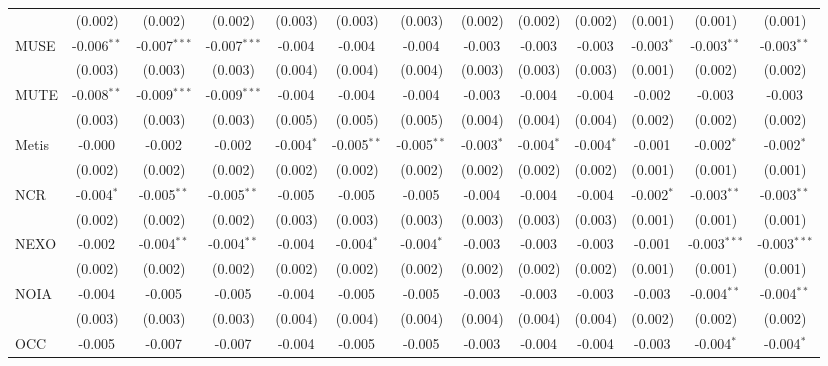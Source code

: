 \begin{table}[!htbp]
\begin{tabular}{@{\extracolsep{5pt}}lcccccccccccc}
  & (0.002) & (0.002) & (0.002) & (0.003) & (0.003) & (0.003) & (0.002) & (0.002) & (0.002) & (0.001) & (0.001) & (0.001) \\
 MUSE & -0.006$^{**}$ & -0.007$^{***}$ & -0.007$^{***}$ & -0.004$^{}$ & -0.004$^{}$ & -0.004$^{}$ & -0.003$^{}$ & -0.003$^{}$ & -0.003$^{}$ & -0.003$^{*}$ & -0.003$^{**}$ & -0.003$^{**}$ \\
  & (0.003) & (0.003) & (0.003) & (0.004) & (0.004) & (0.004) & (0.003) & (0.003) & (0.003) & (0.001) & (0.002) & (0.002) \\
 MUTE & -0.008$^{**}$ & -0.009$^{***}$ & -0.009$^{***}$ & -0.004$^{}$ & -0.004$^{}$ & -0.004$^{}$ & -0.003$^{}$ & -0.004$^{}$ & -0.004$^{}$ & -0.002$^{}$ & -0.003$^{}$ & -0.003$^{}$ \\
  & (0.003) & (0.003) & (0.003) & (0.005) & (0.005) & (0.005) & (0.004) & (0.004) & (0.004) & (0.002) & (0.002) & (0.002) \\
 Metis & -0.000$^{}$ & -0.002$^{}$ & -0.002$^{}$ & -0.004$^{*}$ & -0.005$^{**}$ & -0.005$^{**}$ & -0.003$^{*}$ & -0.004$^{*}$ & -0.004$^{*}$ & -0.001$^{}$ & -0.002$^{*}$ & -0.002$^{*}$ \\
  & (0.002) & (0.002) & (0.002) & (0.002) & (0.002) & (0.002) & (0.002) & (0.002) & (0.002) & (0.001) & (0.001) & (0.001) \\
 NCR & -0.004$^{*}$ & -0.005$^{**}$ & -0.005$^{**}$ & -0.005$^{}$ & -0.005$^{}$ & -0.005$^{}$ & -0.004$^{}$ & -0.004$^{}$ & -0.004$^{}$ & -0.002$^{*}$ & -0.003$^{**}$ & -0.003$^{**}$ \\
  & (0.002) & (0.002) & (0.002) & (0.003) & (0.003) & (0.003) & (0.003) & (0.003) & (0.003) & (0.001) & (0.001) & (0.001) \\
 NEXO & -0.002$^{}$ & -0.004$^{**}$ & -0.004$^{**}$ & -0.004$^{}$ & -0.004$^{*}$ & -0.004$^{*}$ & -0.003$^{}$ & -0.003$^{}$ & -0.003$^{}$ & -0.001$^{}$ & -0.003$^{***}$ & -0.003$^{***}$ \\
  & (0.002) & (0.002) & (0.002) & (0.002) & (0.002) & (0.002) & (0.002) & (0.002) & (0.002) & (0.001) & (0.001) & (0.001) \\
 NOIA & -0.004$^{}$ & -0.005$^{}$ & -0.005$^{}$ & -0.004$^{}$ & -0.005$^{}$ & -0.005$^{}$ & -0.003$^{}$ & -0.003$^{}$ & -0.003$^{}$ & -0.003$^{}$ & -0.004$^{**}$ & -0.004$^{**}$ \\
  & (0.003) & (0.003) & (0.003) & (0.004) & (0.004) & (0.004) & (0.004) & (0.004) & (0.004) & (0.002) & (0.002) & (0.002) \\
 OCC & -0.005$^{}$ & -0.007$^{}$ & -0.007$^{}$ & -0.004$^{}$ & -0.005$^{}$ & -0.005$^{}$ & -0.003$^{}$ & -0.004$^{}$ & -0.004$^{}$ & -0.003$^{}$ & -0.004$^{*}$ & -0.004$^{*}$ \\

\end{tabular}
\end{table}
